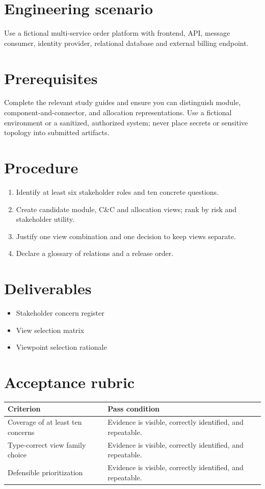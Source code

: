 \documentclass[10pt,letterpaper]{article}
\begin{document}
\DocProvenance
\section{Engineering scenario}
Use a fictional multi-service order platform with frontend, API, message consumer, identity provider, relational database and external billing endpoint.

\section{Prerequisites}
Complete the relevant study guides and ensure you can distinguish module, component-and-connector, and allocation representations. Use a fictional environment or a sanitized, authorized system; never place secrets or sensitive topology into submitted artifacts.

\section{Procedure}
\begin{enumerate}
\item Identify at least six stakeholder roles and ten concrete questions.
\item Create candidate module, C\&C and allocation views; rank by risk and stakeholder utility.
\item Justify one view combination and one decision to keep views separate.
\item Declare a glossary of relations and a release order.
\end{enumerate}
\section{Deliverables}
\begin{itemize}
\item Stakeholder concern register
\item View selection matrix
\item Viewpoint selection rationale
\end{itemize}
\section{Acceptance rubric}
\small
\begin{tabularx}{\linewidth}{@{}YY@{}}
\toprule
\textbf{Criterion} & \textbf{Pass condition} \\
\midrule
Coverage of at least ten concerns & Evidence is visible, correctly identified, and repeatable. \\
Type-correct view family choice & Evidence is visible, correctly identified, and repeatable. \\
Defensible prioritization & Evidence is visible, correctly identified, and repeatable. \\
\bottomrule
\end{tabularx}
\normalsize
\end{document}
